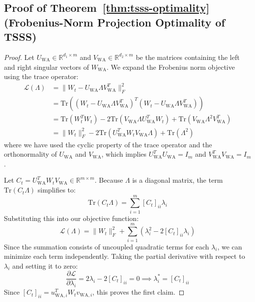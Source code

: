 \documentclass{article}
\theoremstyle{plain}
\theoremstyle{definition}
\theoremstyle{remark}
\begin{document}
\subsection{Proof of Theorem~\ref{thm:tsss-optimality} (Frobenius-Norm Projection Optimality of TSSS)}
\label{appendix:tsss-proof}
\begin{proof}
Let $U_{\text{WA}} \in \mathbb{R}^{d_1 \times m}$ and $V_{\text{WA}} \in \mathbb{R}^{d_2 \times m}$ be the matrices containing the left and right singular vectors of $W_{\text{WA}}$. We expand the Frobenius norm objective using the trace operator:
\begin{align}
    \mathcal{L}(\Lambda) &= \| W_t - U_{\text{WA}} \Lambda V_{\text{WA}}^T \|_F^2 \nonumber \\
    &= \text{Tr}\left( (W_t - U_{\text{WA}} \Lambda V_{\text{WA}}^T)^T (W_t - U_{\text{WA}} \Lambda V_{\text{WA}}^T) \right) \nonumber \\
    &= \text{Tr}(W_t^T W_t) - 2\text{Tr}(V_{\text{WA}} \Lambda U_{\text{WA}}^T W_t) + \text{Tr}(V_{\text{WA}} \Lambda^2 V_{\text{WA}}^T) \nonumber \\
    &= \| W_t \|_F^2 - 2\text{Tr}(U_{\text{WA}}^T W_t V_{\text{WA}} \Lambda) + \text{Tr}(\Lambda^2)
\end{align}
where we have used the cyclic property of the trace operator and the orthonormality of $U_{\text{WA}}$ and $V_{\text{WA}}$, which implies $U_{\text{WA}}^T U_{\text{WA}} = I_m$ and $V_{\text{WA}}^T V_{\text{WA}} = I_m$.

Let $C_t = U_{\text{WA}}^T W_t V_{\text{WA}} \in \mathbb{R}^{m \times m}$. Because $\Lambda$ is a diagonal matrix, the term $\text{Tr}(C_t \Lambda)$ simplifies to:
\begin{equation}
    \text{Tr}(C_t \Lambda) = \sum_{i=1}^m [C_t]_{ii} \lambda_i
\end{equation}
Substituting this into our objective function:
\begin{equation}
    \mathcal{L}(\Lambda) = \| W_t \|_F^2 + \sum_{i=1}^m \left( \lambda_i^2 - 2 [C_t]_{ii} \lambda_i \right)
\end{equation}
Since the summation consists of uncoupled quadratic terms for each $\lambda_i$, we can minimize each term independently. Taking the partial derivative with respect to $\lambda_i$ and setting it to zero:
\begin{equation}
    \frac{\partial \mathcal{L}}{\partial \lambda_i} = 2 \lambda_i - 2 [C_t]_{ii} = 0 \implies \lambda_i^* = [C_t]_{ii}
\end{equation}
Since $[C_t]_{ii} = u_{\text{WA}, i}^T W_t v_{\text{WA}, i}$, this proves the first claim.


\end{proof}
\end{document}
